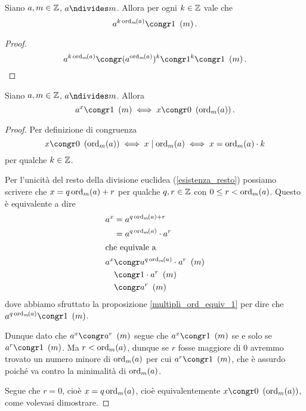 \begin{proposition}\label{multipli_ord_equiv_1}
    Siano $a, m \in \Z$, $a \ndivides m$. Allora per ogni $k \in \Z$ vale che \begin{equation}
        a^{k\ord{a}{m}} \congr 1 \Mod{m}.
    \end{equation}
\end{proposition}
\begin{proof}
    \[
        a^{k\ord{a}{m}} \congr (a^{\ord{a}{m}})^k \congr 1^k \congr 1 \Mod{m}. \qedhere
    \]
\end{proof}

\begin{proposition}\label{solo_multipli_ord_equiv_1}
    Siano $a, m \in \Z$, $a \ndivides m$. Allora \begin{equation}
        a^x \congr 1 \Mod{m} \iff x \congr 0 \Mod{\ord{a}{m}}.
    \end{equation}
\end{proposition}
\begin{proof}
    Per definizione di congruenza 
    \[x \congr 0 \Mod{\ord{a}{m}} \iff x \divides \ord{a}{m} \iff x = \ord{a}{m}\cdot k\] 
    per qualche $k \in \Z$.

    Per l'unicità del resto della divisione euclidea (\ref{esistenza_resto}) possiamo scrivere che $x = q\ord{a}{m} + r$ per qualche $q, r \in \Z$ con $0 \leq r < \ord{a}{m}$. Questo è equivalente a dire \begin{alignat*}
        {1}
        &\begin{alignedat}
            {1}
            a^x &= a^{q\ord{a}{m} + r}\\
            &= a^{q\ord{a}{m}}\cdot a^r
        \end{alignedat} \\
        \intertext{che equivale a}
        &\begin{alignedat}
            {1}
            a^x &\congr a^{q\ord{a}{m}}\cdot a^r \Mod{m} \\
            &\congr 1 \cdot a^r \Mod{m}\\
            &\congr a^r \Mod{m}
        \end{alignedat}
    \end{alignat*}
    dove abbiamo sfruttato la proposizione \ref{multipli_ord_equiv_1} per dire che $a^{q\ord{a}{m}}\congr 1 \Mod{m}$.

    Dunque dato che $a^x \congr a^r \Mod{m}$ segue che $a^x \congr 1 \Mod{m}$ se e solo se $a^r \congr 1 \Mod{m}$. Ma $r < \ord{a}{m}$, dunque se $r$ fosse maggiore di $0$ avremmo trovato un numero minore di $\ord{a}{m}$ per cui $a^r \congr 1 \Mod{m}$, che è assurdo poiché va contro la minimalità di $\ord{a}{m}$.

    Segue che $r = 0$, cioè $x = q\ord{a}{m}$, cioè equivalentemente $x \congr 0 \Mod{\ord{a}{m}}$, come volevasi dimostrare.
\end{proof}

